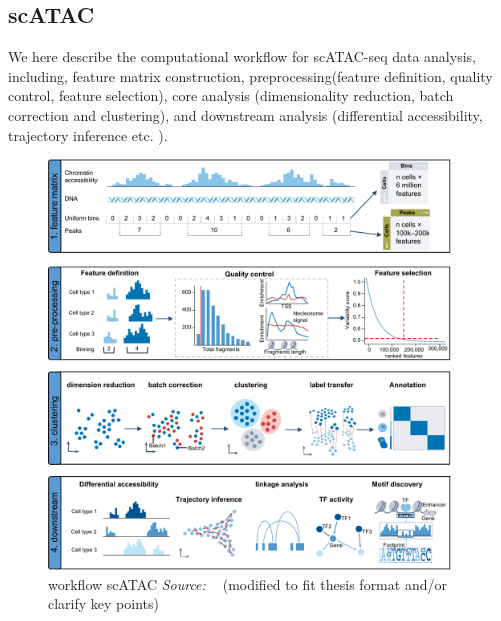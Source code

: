\subsection{scATAC}
\label{background:sec2:scATAC}
We here describe the computational workflow for scATAC-seq data analysis, including, feature matrix construction, preprocessing(feature definition, quality control,  feature selection), core analysis (dimensionality reduction, batch correction and clustering), and downstream analysis (differential accessibility, trajectory inference etc. ).
\begin{figure}[!ht]
	\centering
	\includegraphics[width=0.95\textwidth]{workflow_scATAC/fig}
	\vspace{0.1cm}
	\caption[A common computational scATAC analysis workflow]{workflow scATAC  \emph{Source: ~\cite{heumos2023best}} (modified to fit thesis format and/or clarify key points)}
	\label{fig:workflow_scATAC}
\end{figure}

